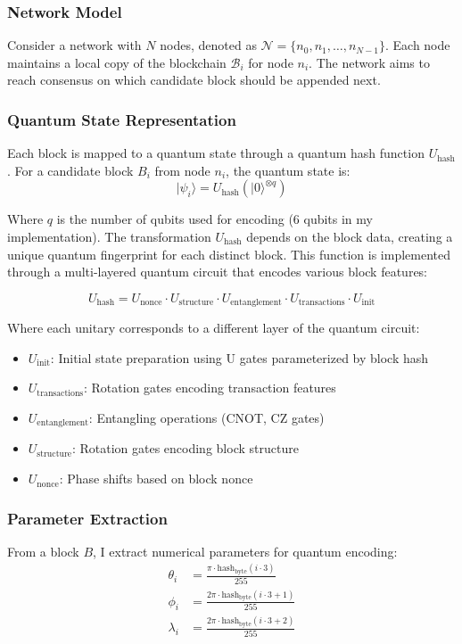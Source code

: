 \documentclass[11pt,a4paper]{article}
\begin{document}
\subsubsection{Network Model}
Consider a network with $N$ nodes, denoted as $\mathcal{N} = \{n_0, n_1, \ldots, n_{N-1}\}$. Each node maintains a local copy of the blockchain $\mathcal{B}_i$ for node $n_i$. The network aims to reach consensus on which candidate block should be appended next.

\subsubsection{Quantum State Representation}
Each block is mapped to a quantum state through a quantum hash function $U_{\text{hash}}$. For a candidate block $B_i$ from node $n_i$, the quantum state is:
\begin{equation}
|\psi_i\rangle = U_{\text{hash}}(|0\rangle^{\otimes q})
\end{equation}

Where $q$ is the number of qubits used for encoding (6 qubits in my implementation). The transformation $U_{\text{hash}}$ depends on the block data, creating a unique quantum fingerprint for each distinct block. This function is implemented through a multi-layered quantum circuit that encodes various block features:

\begin{equation}
U_{\text{hash}} = U_{\text{nonce}} \cdot U_{\text{structure}} \cdot U_{\text{entanglement}} \cdot U_{\text{transactions}} \cdot U_{\text{init}}
\end{equation}

Where each unitary corresponds to a different layer of the quantum circuit:
\begin{itemize}
    \item $U_{\text{init}}$: Initial state preparation using U gates parameterized by block hash
    \item $U_{\text{transactions}}$: Rotation gates encoding transaction features
    \item $U_{\text{entanglement}}$: Entangling operations (CNOT, CZ gates)
    \item $U_{\text{structure}}$: Rotation gates encoding block structure
    \item $U_{\text{nonce}}$: Phase shifts based on block nonce
\end{itemize}

\subsubsection{Parameter Extraction}
From a block $B$, I extract numerical parameters for quantum encoding:
\begin{equation}
\begin{aligned}
\theta_i &= \frac{\pi \cdot \text{hash}_{\text{byte}}(i \cdot 3)}{255} \\
\phi_i &= \frac{2\pi \cdot \text{hash}_{\text{byte}}(i \cdot 3 + 1)}{255} \\
\lambda_i &= \frac{2\pi \cdot \text{hash}_{\text{byte}}(i \cdot 3 + 2)}{255}
\end{aligned}
\end{equation}
\end{document}
